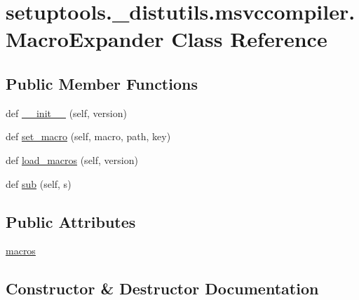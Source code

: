 \hypertarget{classsetuptools_1_1__distutils_1_1msvccompiler_1_1MacroExpander}{}\section{setuptools.\+\_\+distutils.\+msvccompiler.\+Macro\+Expander Class Reference}
\label{classsetuptools_1_1__distutils_1_1msvccompiler_1_1MacroExpander}
\subsection*{Public Member Functions}
\begin{DoxyCompactItemize}
\item 
def \hyperlink{classsetuptools_1_1__distutils_1_1msvccompiler_1_1MacroExpander_adc3c01dbfda926215051f7c88eb6e9f4}{\+\_\+\+\_\+init\+\_\+\+\_\+} (self, version)
\item 
def \hyperlink{classsetuptools_1_1__distutils_1_1msvccompiler_1_1MacroExpander_ac498aa2c7959c3173af79cfd1dbf5092}{set\+\_\+macro} (self, macro, path, key)
\item 
def \hyperlink{classsetuptools_1_1__distutils_1_1msvccompiler_1_1MacroExpander_abdaf42b65251c2149de05709607b067c}{load\+\_\+macros} (self, version)
\item 
def \hyperlink{classsetuptools_1_1__distutils_1_1msvccompiler_1_1MacroExpander_abc18c2454c87f009cf71b6375f648e78}{sub} (self, s)
\end{DoxyCompactItemize}
\subsection*{Public Attributes}
\begin{DoxyCompactItemize}
\item 
\hyperlink{classsetuptools_1_1__distutils_1_1msvccompiler_1_1MacroExpander_a17008faf51af0e834d74919e83277b03}{macros}
\end{DoxyCompactItemize}


\subsection{Constructor \& Destructor Documentation}
\mbox{\label{classsetuptools_1_1__distutils_1_1msvccompiler_1_1MacroExpander_adc3c01dbfda926215051f7c88eb6e9f4}} 
